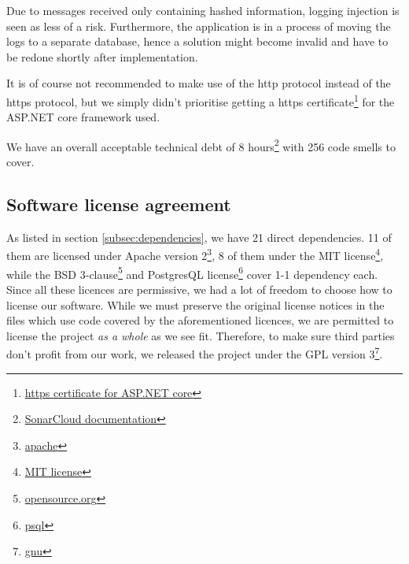 \documentclass[report/main.tex]{subfiles}
\begin{document}
            Due to messages received only containing hashed information, logging injection is seen as less of a risk. Furthermore, the application is in a process of moving the logs to a separate database, hence a solution might become invalid and have to be redone shortly after implementation.

            It is of course not recommended to make use of the http protocol instead of the https protocol, but we simply didn't prioritise getting a https certificate\footnote{\href{https://docs.microsoft.com/en-us/aspnet/core/security/enforcing-ssl?view=aspnetcore-5.0\&tabs=visual-studio}{https certificate for ASP.NET core}} for the ASP.NET core framework used.
            
            We have an overall acceptable technical debt of 8 hours\footnote{\href{https://docs.sonarqube.org/latest/user-guide/metric-definitions/\#header-4}{SonarCloud documentation}} with 256 code smells to cover.
    
        \subsection{Software license agreement}
            As listed in section \ref{subsec:dependencies}, we have 21 direct dependencies. 11 of them are licensed under Apache version 2\footnote{\href{https://www.apache.org/licenses/LICENSE-2.0}{apache}}, 8 of them under the MIT license\footnote{\href{https://opensource.org/licenses/MIT}{MIT license}}, while the BSD 3-clause\footnote{\href{https://opensource.org/licenses/BSD-3-Clause}{opensource.org}} and PostgresQL license\footnote{\href{https://www.postgresql.org/about/licence/}{psql}} cover 1-1 dependency each. Since all these licences are permissive, we had a lot of freedom to choose how to license our software. While we must preserve the original license notices in the files which use code covered by the aforementioned licences, we are permitted to license the project \textit{as a whole} as we see fit. Therefore, to make sure third parties don't profit from our work, we released the project under the GPL version 3\footnote{\href{https://www.gnu.org/licenses/gpl-3.0.en.html}{gnu}}.
    
\end{document}
